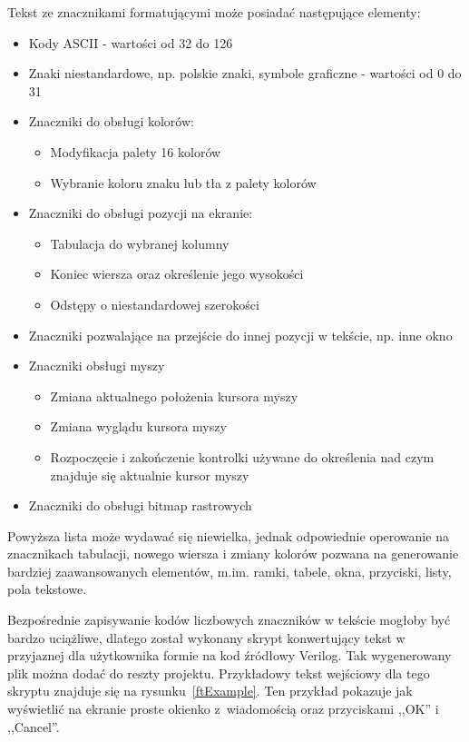 Tekst ze znacznikami formatującymi może posiadać następujące elementy:
\begin{itemize}
	\item Kody ASCII - wartości od 32 do 126
	\item Znaki niestandardowe, np. polskie znaki, symbole graficzne - wartości od 0 do 31
	\item Znaczniki do obsługi kolorów:
	\begin{itemize}
		\item Modyfikacja palety 16 kolorów
		\item Wybranie koloru znaku lub tła z palety kolorów
	\end{itemize}
	\item Znaczniki do obsługi pozycji na ekranie:
	\begin{itemize}
		\item Tabulacja do wybranej kolumny
		\item Koniec wiersza oraz określenie jego wysokości
		\item Odstępy o niestandardowej szerokości
	\end{itemize}
	\item Znaczniki pozwalające na przejście do innej pozycji w tekście, np. inne okno
	\item Znaczniki obsługi myszy
	\begin{itemize}
		\item Zmiana aktualnego położenia kursora myszy
		\item Zmiana wyglądu kursora myszy
		\item Rozpoczęcie i zakończenie kontrolki używane do określenia nad czym znajduje się aktualnie kursor myszy
	\end{itemize}
	\item Znaczniki do obsługi bitmap rastrowych
\end{itemize}

Powyższa lista może wydawać się niewielka, jednak odpowiednie operowanie na znacznikach tabulacji, nowego wiersza i zmiany kolorów pozwana na generowanie bardziej zaawansowanych elementów, m.im. ramki, tabele, okna, przyciski, listy, pola tekstowe.

Bezpośrednie zapisywanie kodów liczbowych znaczników w tekście mogłoby być bardzo uciążliwe, dlatego został wykonany skrypt konwertujący tekst w przyjaznej dla użytkownika formie na kod źródłowy Verilog. Tak wygenerowany plik można dodać do reszty projektu. Przykładowy tekst wejściowy dla tego skryptu znajduje się na rysunku~\ref{ftExample}. Ten przykład pokazuje jak wyświetlić na ekranie proste okienko z~wiadomością oraz przyciskami ,,OK'' i ,,Cancel''.

